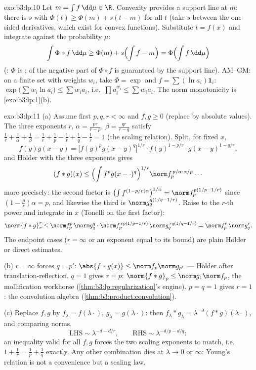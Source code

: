 \begin{solution}{exo:b3:lp:10}
Let $m = \int f\,\dd\mu \in \R$. Convexity provides a support
line at $m$: there is $s$ with $\Phi(t) \geq \Phi(m) + s(t -
m)$ for all $t$ (take $s$ between the one-sided derivatives,
which exist for convex functions). Substitute $t = f(x)$ and
integrate against the probability $\mu$:
\[
\int\Phi\circ f\,\dd\mu \geq \Phi(m) + s\Bigl(\int f - m\Bigr)
= \Phi\Bigl(\int f\,\dd\mu\Bigr)
\]
(: $\Phi$ is ;  of the
negative part of $\Phi\circ f$ is guaranteed by the support
line). AM--GM: on a finite set with weights $w_i$, take
$\Phi = \exp$ and $f = \sum(\ln a_i)\mathbf 1_i$:
$\exp\bigl(\sum w_i\ln a_i\bigr) \leq \sum w_ia_i$, i.e.\
$\prod a_i^{w_i} \leq \sum w_ia_i$. The norm monotonicity is
\cref{exo:b3:lp:1}(b).
\end{solution}

\begin{solution}{exo:b3:lp:11}
(a) Assume first $p, q, r < \infty$ and $f, g \geq 0$
(replace by absolute values). The three exponents $r$,
$\alpha = \frac{pr}{r-p}$, $\beta = \frac{qr}{r-q}$
satisfy $\frac1r + \frac1\alpha + \frac1\beta = \frac1r +
\frac1p - \frac1r + \frac1q - \frac1r = 1$ (the scaling
relation). Split, for fixed $x$,
\[
f(y)g(x-y) = \bigl[f(y)^pg(x-y)^q\bigr]^{1/r}\cdot
f(y)^{1 - p/r}\cdot g(x-y)^{1 - q/r},
\]
and H\"older with the three exponents gives
\[
(f*g)(x) \leq \Bigl(\int f^pg(x-\cdot)^q\Bigr)^{1/r}
\norm f_p^{\,p/\alpha\cdot\alpha/p}\cdots
\]
more precisely: the second factor is
$\bigl(\int f^{(1-p/r)\alpha}\bigr)^{1/\alpha} =
\norm f_p^{p(1/p - 1/r)}$ since $(1 - \frac pr)\alpha = p$,
and likewise the third is $\norm g_q^{q(1/q - 1/r)}$. Raise
to the $r$-th power and integrate in $x$ (Tonelli on the
first factor):
\[
\norm{f*g}_r^r \leq \norm f_p^p\,\norm g_q^q\cdot
\norm f_p^{\,rp(1/p - 1/r)}\,\norm g_q^{\,rq(1/q - 1/r)}
= \norm f_p^r\,\norm g_q^r .
\]
The endpoint cases ($r = \infty$ or an exponent equal to
its bound) are plain H\"older or direct estimates.

(b) $r = \infty$ forces $q = p'$: $\abs{f*g(x)} \leq \norm
f_p\norm g_{p'}$ --- H\"older after translation-reflection.
$q = 1$ gives $r = p$: $\norm{f*g}_p \leq \norm
g_1\norm f_p$, the mollification workhorse
(\cref{thm:b3:lp:regularization}'s engine). $p = q = 1$
gives $r = 1$: the convolution algebra
(\cref{thm:b3:product:convolution}).

(c) Replace $f, g$ by $f_\lambda = f(\lambda\cdot)$,
$g_\lambda = g(\lambda\cdot)$: then $f_\lambda*g_\lambda =
\lambda^{-d}(f*g)(\lambda\cdot)$, and comparing norms,
\[
\text{LHS} \sim \lambda^{-d - d/r}, \qquad
\text{RHS} \sim \lambda^{-d/p - d/q} :
\]
an inequality valid for all $f, g$ forces the two scaling
exponents to match, i.e.\ $1 + \frac1r = \frac1p + \frac1q$
exactly. Any other combination dies at $\lambda \to 0$ or
$\infty$: Young's relation is not a convenience but a
scaling law.
\end{solution}

